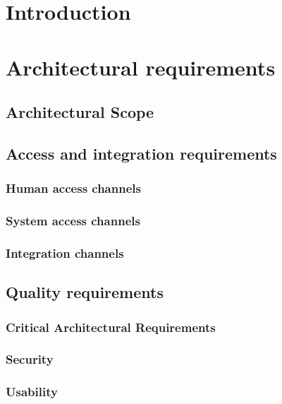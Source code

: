 \documentclass[a4paper,12pt,titlepage]{article}
\begin{document}


\tableofcontents
\newpage

\section{Introduction}

\section{Architectural requirements}
	\subsection{Architectural Scope} %
	
	\newpage
	
	\subsection{Access and integration requirements}
			\subsubsection{Human access channels}	
			\subsubsection{System access channels}	
			\subsubsection{Integration channels}
 	\subsection{Quality requirements}
 	
			\subsubsection{Critical Architectural Requirements}
			\subsubsection{Security}
			
			
			\subsubsection{Usability}
			
			
\end{document}
